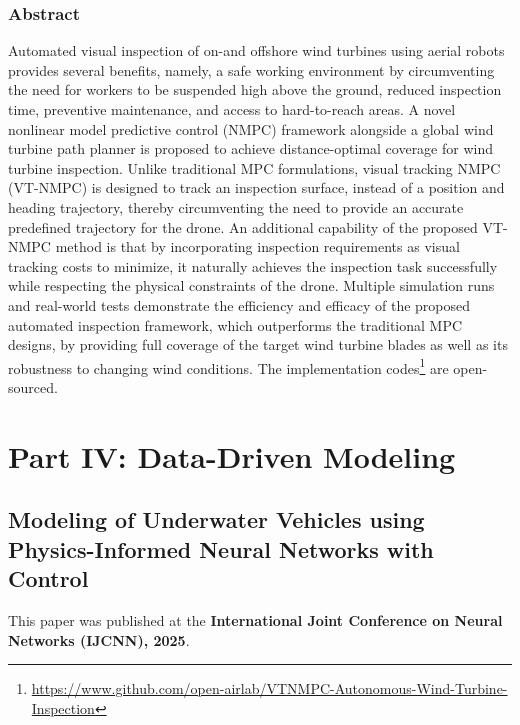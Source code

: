 \documentclass[
10pt, %
b5paper, %
twoside, %
openright  %
]{book}  %
\begin{document}
\section{Abstract}
Automated visual inspection of on-and offshore wind turbines using aerial robots provides several benefits, namely, a safe working environment by circumventing the need for workers to be suspended high above the ground, reduced inspection time, preventive maintenance, and access to hard-to-reach areas. A novel nonlinear model predictive control (NMPC) framework alongside a global wind turbine path planner is proposed to achieve distance-optimal coverage for wind turbine inspection. Unlike traditional MPC formulations, visual tracking NMPC (VT-NMPC) is designed to track an inspection surface, instead of a position and heading trajectory, thereby circumventing the need to provide an accurate predefined trajectory for the drone. An additional capability of the proposed VT-NMPC method is that by incorporating inspection requirements as visual tracking costs to minimize, it naturally achieves the inspection task successfully while respecting the physical constraints of the drone. Multiple simulation runs and real-world tests demonstrate the efficiency and efficacy of the proposed automated inspection framework, which outperforms the traditional MPC designs, by providing full coverage of the target wind turbine blades as well as its robustness to changing wind conditions. The implementation codes\footnote{\url{https://www.github.com/open-airlab/VTNMPC-Autonomous-Wind-Turbine-Inspection}} are open-sourced.
\newpage


%


\part*{Part IV: Data-Driven Modeling}

\chapter{Modeling of Underwater Vehicles using
Physics-Informed Neural Networks with Control}
\vspace{1cm}
This paper was published at the \textbf{International Joint Conference on Neural Networks (IJCNN), 2025}.
\end{document}
